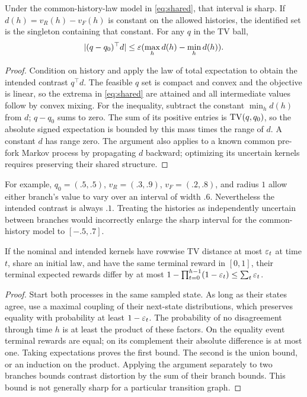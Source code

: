 \begin{corollary}\label{cor:shared}
Under the common-history-law model in \eqref{eq:shared}, that interval is sharp. If $d(h)=v_R(h)-v_F(h)$ is constant on the allowed histories, the identified set is the singleton containing that constant. For any $q$ in the TV ball,
\[
 |(q-q_0)^\top d|\leq\varepsilon(\max_h d(h)-\min_h d(h)).
\]
\end{corollary}
\begin{proof}
Condition on history and apply the law of total expectation to obtain the intended contrast $q^\top d$. The feasible $q$ set is compact and convex and the objective is linear, so the extrema in \eqref{eq:shared} are attained and all intermediate values follow by convex mixing. For the inequality, subtract the constant $\min_h d(h)$ from $d$; $q-q_0$ sums to zero. The sum of its positive entries is $\operatorname{TV}(q,q_0)$, so the absolute signed expectation is bounded by this mass times the range of $d$. A constant $d$ has range zero. The argument also applies to a known common pre-fork Markov process by propagating $d$ backward; optimizing its uncertain kernels requires preserving their shared structure.
\end{proof}

For example, $q_0=(.5,.5)$, $v_R=(.3,.9)$, $v_F=(.2,.8)$, and radius $1$ allow either branch's value to vary over an interval of width $.6$. Nevertheless the intended contrast is always $.1$. Treating the histories as independently uncertain between branches would incorrectly enlarge the sharp interval for the common-history model to $[-.5,.7]$.

\begin{lemma}\label{lem:coupling}
If the nominal and intended kernels have rowwise TV distance at most $\varepsilon_t$ at time $t$, share an initial law, and have the same terminal reward in $[0,1]$, their terminal expected rewards differ by at most $1-\prod_{t=0}^{h-1}(1-\varepsilon_t)\leq\sum_t\varepsilon_t$.
\end{lemma}
\begin{proof}
Start both processes in the same sampled state. As long as their states agree, use a maximal coupling of their next-state distributions, which preserves equality with probability at least $1-\varepsilon_t$. The probability of no disagreement through time $h$ is at least the product of these factors. On the equality event terminal rewards are equal; on its complement their absolute difference is at most one. Taking expectations proves the first bound. The second is the union bound, or an induction on the product. Applying the argument separately to two branches bounds contrast distortion by the sum of their branch bounds. This bound is not generally sharp for a particular transition graph.
\end{proof}


